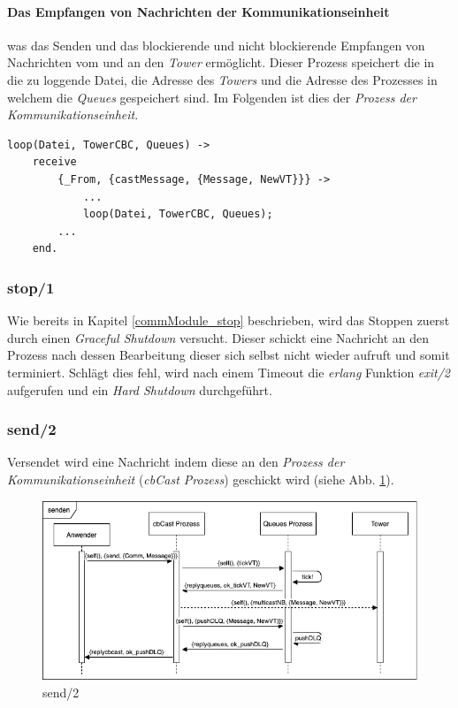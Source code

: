 \paragraph{Das Empfangen von Nachrichten der Kommunikationseinheit} was das Senden und das blockierende und nicht blockierende Empfangen von Nachrichten vom und an den \textit{Tower} ermöglicht. Dieser Prozess speichert die in die zu loggende Datei, die Adresse des \textit{Towers} und die Adresse des Prozesses in welchem die \textit{Queues} gespeichert sind. Im Folgenden ist dies der \textit{Prozess der Kommunikationseinheit}.

\begin{lstlisting}
loop(Datei, TowerCBC, Queues) ->
    receive
        {_From, {castMessage, {Message, NewVT}}} ->
            ...
            loop(Datei, TowerCBC, Queues);
        ...
    end.
\end{lstlisting}

\subsubsection{stop/1} \label{cbcast_stop_realisierung}

Wie bereits in Kapitel \ref{commModule_stop} beschrieben, wird das Stoppen zuerst durch einen \textit{Graceful Shutdown} versucht. Dieser schickt eine Nachricht an den Prozess nach dessen Bearbeitung dieser sich selbst nicht wieder aufruft und somit terminiert. Schlägt dies fehl, wird nach einem Timeout die \textit{erlang} Funktion \textit{exit/2} aufgerufen und ein \textit{Hard Shutdown} durchgeführt.

\subsubsection{send/2} \label{cbcast_send_realisierung}

Versendet wird eine Nachricht indem diese an den \textit{Prozess der Kommunikationseinheit} (\textit{cbCast Prozess}) geschickt wird (siehe Abb. \ref{fig:sequence_send_realisierung}).

\begin{figure}[htbp]
\begin{center}
\includegraphics[scale=0.6]{Latex/Bilder/send_realisierung.png}
\caption{\label{fig:sequence_send_realisierung} send/2}
\end{center}
\end{figure}

